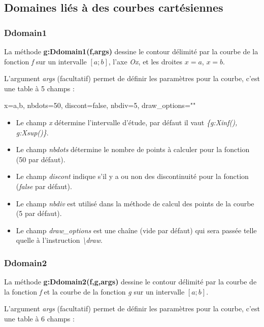 \documentclass[%
10pt,%
a4paper,%
french,%
]%
{article}%
\begin{document}
\subsection{Domaines liés à des courbes cartésiennes}

\subsubsection{Ddomain1}

La méthode \textbf{g:Ddomain1(f,args)} dessine le contour délimité par la courbe de la fonction \emph{f} sur un intervalle \([a;b]\), l'axe \emph{Ox}, et les droites \(x=a\), \(x=b\).

L'argument \emph{args} (facultatif) permet de définir les paramètres pour la courbe, c'est une table à 5 champs : 

  \begin{TeXcode}
    { x={a,b},  nbdots=50, discont=false, nbdiv=5, draw_options="" }
  \end{TeXcode}
  
    \begin{itemize}
        \item Le champ \emph{x} détermine l'intervalle d'étude, par défaut il vaut \emph{\{g:Xinf(), g:Xsup()\}}.
        \item Le champ \emph{nbdots} détermine le nombre de points à calculer pour la fonction (50 par défaut).
        \item Le champ \emph{discont} indique s'il y a ou non des discontinuité pour la fonction (\emph{false} par défaut).
        \item Le champ \emph{nbdiv} est utilisé dans la méthode de calcul des points de la courbe (5 par défaut).
        \item Le champ \emph{draw\_options} est une chaîne (vide par défaut) qui sera passée telle quelle à l'instruction \emph{\textbackslash draw}.
  
    \end{itemize}
    
\subsubsection{Ddomain2}

La méthode \textbf{g:Ddomain2(f,g,args)} dessine le contour délimité par la courbe de la fonction \emph{f} et la courbe de la fonction \emph{g} sur un intervalle \([a;b]\).

L'argument \emph{args} (facultatif) permet de définir les paramètres pour la courbe, c'est une table à 6 champs : 
\end{document}
